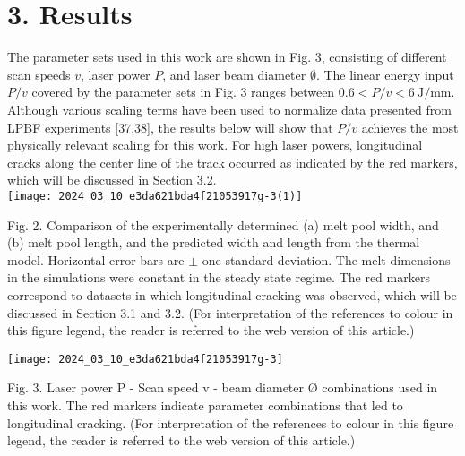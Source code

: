 \documentclass[10pt]{article}
\begin{document}
\section*{3. Results}
The parameter sets used in this work are shown in Fig. 3, consisting of different scan speeds $v$, laser power $P$, and laser beam diameter $\emptyset$. The linear energy input $P / v$ covered by the parameter sets in Fig. 3 ranges between $0.6<P / v<6 \mathrm{~J} / \mathrm{mm}$. Although various scaling terms have been used to normalize data presented from LPBF experiments [37,38], the results below will show that $P / v$ achieves the most physically relevant scaling for this work. For high laser powers, longitudinal cracks along the center line of the track occurred as indicated by the red markers, which will be discussed in Section 3.2.\\
\texttt{[image: 2024\_03\_10\_e3da621bda4f21053917g-3(1)]}

Fig. 2. Comparison of the experimentally determined (a) melt pool width, and (b) melt pool length, and the predicted width and length from the thermal model. Horizontal error bars are $\pm$ one standard deviation. The melt dimensions in the simulations were constant in the steady state regime. The red markers correspond to datasets in which longitudinal cracking was observed, which will be discussed in Section 3.1 and 3.2. (For interpretation of the references to colour in this figure legend, the reader is referred to the web version of this article.)

\begin{center}
\texttt{[image: 2024\_03\_10\_e3da621bda4f21053917g-3]}
\end{center}

Fig. 3. Laser power $\mathrm{P}$ - Scan speed $\mathrm{v}$ - beam diameter $Ø$ combinations used in this work. The red markers indicate parameter combinations that led to longitudinal cracking. (For interpretation of the references to colour in this figure legend, the reader is referred to the web version of this article.)
\end{document}
